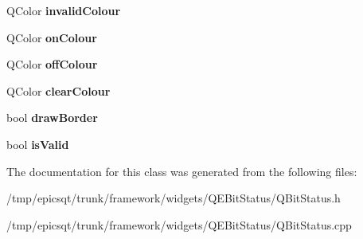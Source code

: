 \begin{DoxyCompactItemize}
\item 
\hypertarget{classQBitStatus_a783ddc5a73118bc4f5f5d5655217b277}{
QColor {\bfseries invalidColour}}
\label{classQBitStatus_a783ddc5a73118bc4f5f5d5655217b277}

\item 
\hypertarget{classQBitStatus_a3c111128b54ab308691db36f0ad6247f}{
QColor {\bfseries onColour}}
\label{classQBitStatus_a3c111128b54ab308691db36f0ad6247f}

\item 
\hypertarget{classQBitStatus_a6a600dab3056ee05a50e6491deb6c68d}{
QColor {\bfseries offColour}}
\label{classQBitStatus_a6a600dab3056ee05a50e6491deb6c68d}

\item 
\hypertarget{classQBitStatus_a073132687b35b82b5054c0ab0eab7620}{
QColor {\bfseries clearColour}}
\label{classQBitStatus_a073132687b35b82b5054c0ab0eab7620}

\item 
\hypertarget{classQBitStatus_a6b6688a4e867acd77f96a5699d8e52e5}{
bool {\bfseries drawBorder}}
\label{classQBitStatus_a6b6688a4e867acd77f96a5699d8e52e5}

\item 
\hypertarget{classQBitStatus_a4addafd77152d58b5cd42163ecbf06f4}{
bool {\bfseries isValid}}
\label{classQBitStatus_a4addafd77152d58b5cd42163ecbf06f4}

\end{DoxyCompactItemize}


The documentation for this class was generated from the following files:\begin{DoxyCompactItemize}
\item 
/tmp/epicsqt/trunk/framework/widgets/QEBitStatus/QBitStatus.h\item 
/tmp/epicsqt/trunk/framework/widgets/QEBitStatus/QBitStatus.cpp\end{DoxyCompactItemize}
